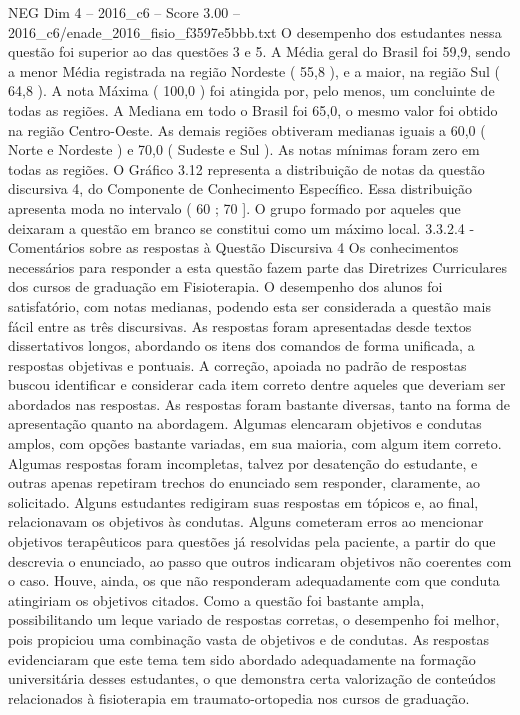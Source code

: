 \begin{textsample}{NEG Dim 4 – 2016\_c6 – Score 3.00 – 2016\_c6/enade\_2016\_fisio\_f3597e5bbb.txt}
O desempenho dos estudantes nessa questão foi superior ao das questões 3 e 5.
A Média geral do Brasil foi 59,9, sendo a menor Média registrada na região Nordeste ( 55,8 ), e a maior, na região Sul ( 64,8 ).
A nota Máxima ( 100,0 ) foi atingida por, pelo menos, um concluinte de todas as regiões.
A Mediana em todo o Brasil foi 65,0, o mesmo valor foi obtido na região Centro-Oeste.
As demais regiões obtiveram medianas iguais a 60,0 ( Norte e Nordeste ) e 70,0 ( Sudeste e Sul ).
As notas mínimas foram zero em todas as regiões.
O Gráfico 3.12 representa a distribuição de notas da questão discursiva 4, do Componente de Conhecimento Específico.
Essa distribuição apresenta moda no intervalo ( 60 ; 70 ].
O grupo formado por aqueles que deixaram a questão em branco se constitui como um máximo local. 3.3.2.4 - Comentários sobre as respostas à Questão Discursiva 4 Os conhecimentos necessários para responder a esta questão fazem parte das Diretrizes Curriculares dos cursos de graduação em Fisioterapia.
O desempenho dos alunos foi satisfatório, com notas medianas, podendo esta ser considerada a questão mais fácil entre as três discursivas.
As respostas foram apresentadas desde textos dissertativos longos, abordando os itens dos comandos de forma unificada, a respostas objetivas e pontuais.
A correção, apoiada no padrão de respostas buscou identificar e considerar cada item correto dentre aqueles que deveriam ser abordados nas respostas.
As respostas foram bastante diversas, tanto na forma de apresentação quanto na abordagem.
Algumas elencaram objetivos e condutas amplos, com opções bastante variadas, em sua maioria, com algum item correto.
Algumas respostas foram incompletas, talvez por desatenção do estudante, e outras apenas repetiram trechos do enunciado sem responder, claramente, ao solicitado.
Alguns estudantes redigiram suas respostas em tópicos e, ao final, relacionavam os objetivos às condutas.
Alguns cometeram erros ao mencionar objetivos terapêuticos para questões já resolvidas pela paciente, a partir do que descrevia o enunciado, ao passo que outros indicaram objetivos não coerentes com o caso.
Houve, ainda, os que não responderam adequadamente com que conduta atingiriam os objetivos citados.
Como a questão foi bastante ampla, possibilitando um leque variado de respostas corretas, o desempenho foi melhor, pois propiciou uma combinação vasta de objetivos e de condutas.
As respostas evidenciaram que este tema tem sido abordado adequadamente na formação universitária desses estudantes, o que demonstra certa valorização de conteúdos relacionados à fisioterapia em traumato-ortopedia nos cursos de graduação.

\end{textsample}

